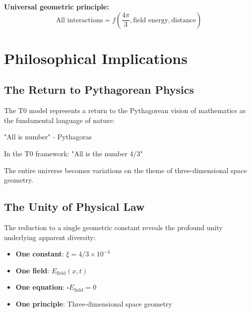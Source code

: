 \documentclass[12pt,a4paper]{report}
\begin{document}
\textbf{Universal geometric principle:}
\begin{equation}
	\text{All interactions} = f\left(\frac{4\pi}{3}, \text{field energy}, \text{distance}\right)
\end{equation}

\section{Philosophical Implications}
\label{sec:philosophical_implications}

\subsection{The Return to Pythagorean Physics}
\label{subsec:pythagorean_physics}

The T0 model represents a return to the Pythagorean vision of mathematics as the fundamental language of nature:

\begin{tcolorbox}[colback=blue!5!white,colframe=blue!75!black,title=Pythagorean Insight]
	"All is number" - Pythagoras
	
	In the T0 framework: "All is the number 4/3"
	
	The entire universe becomes variations on the theme of three-dimensional space geometry.
\end{tcolorbox}

\subsection{The Unity of Physical Law}
\label{subsec:unity_physical_law}

The reduction to a single geometric constant reveals the profound unity underlying apparent diversity:

\begin{itemize}
	\item \textbf{One constant}: $\xi = 4/3 \times 10^{-4}$
	\item \textbf{One field}: $E_{\text{field}}(x,t)$
	\item \textbf{One equation}: $\square E_{\text{field}} = 0$
	\item \textbf{One principle}: Three-dimensional space geometry
\end{itemize}
\end{document}
